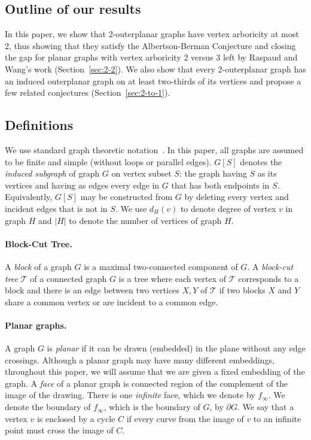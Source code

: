 \documentclass[11pt]{article}
\begin{document}
\subsection{Outline of our results}
In this paper, we show that 2-outerplanar graphs have vertex arboricity at most 2, thus showing that they satisfy the Albertson-Berman Conjecture and closing the gap for planar graphs with vertex arboricity 2 versus 3 left by Raspaud and Wang's work (Section~\ref{sec:2-2}).  We also show that every 2-outerplanar graph has an induced outerplanar graph on at least two-thirds of its vertices and propose a few related conjectures (Section~\ref{sec:2-to-1}).  

\subsection{Definitions}

We use standard graph theoretic notation~\cite{Diestel05}.  In this paper, all graphs are assumed to be finite and simple (without loops or parallel edges).  $G[S]$ denotes the \emph{induced subgraph} of graph $G$ on vertex subset $S$: the graph having $S$ as its vertices and having as edges every edge in $G$ that has both endpoints in $S$. Equivalently, $G[S]$ may be constructed from $G$ by deleting every vertex and incident edges that is not in $S$. We use $d_H(v)$ to denote degree of vertex $v$ in graph $H$ and $|H|$ to denote the number of vertices of graph $H$.

\paragraph{Block-Cut Tree.} A \emph{block} of a graph $G$ is a maximal two-connected component of $G$. A \emph{block-cut tree} $\mathcal{T}$ of a connected graph $G$ is a tree where each vertex of $\mathcal{T}$ corresponds to a block and there is an edge between two vertices $X,Y$ of $\mathcal{T}$ if two blocks $X$ and $Y$ share a common vertex or are incident to a common edge. 
\paragraph{Planar graphs.} A graph $G$ is \emph{planar} if it can be drawn (embedded) in the plane without any edge crossings.  Although a planar graph may have many different embeddings, throughout this paper, we will assume that we are given a fixed embedding of the graph.  A {\em face} of a planar graph is connected region of the complement of the image of the drawing.  There is one {\em infinite} face, which we denote by $f_\infty$. We denote the boundary of $f_\infty$, which is the boundary of $G$, by $\partial G$. We say that a vertex $v$ is enclosed by a cycle $C$ if every curve from the image of $v$ to an infinite point must cross the image of $C$.
\end{document}

